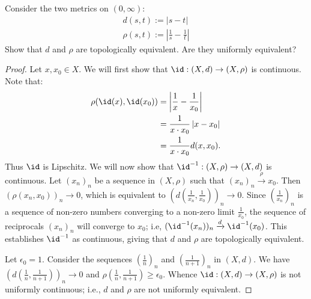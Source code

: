 \documentclass[11pt,twoside,openany]{memoir}
\begin{document}
    \addtocounter{exercise}{1}
    \iffalse
    \begin{exercise}
        Let $(X,d)$ be a metric space, $f,g:X \rightarrow F$ continuous maps, and $a \in F$. Show that $f+g$, $fg$, and $\alpha f$ are continuous.
    \end{exercise}
        {\color{red} \begin{proof}
            
        \end{proof}}
    \fi
    \begin{exercise}
        Consider the two metrics on $(0,\infty)$:
            \begin{equation*}
            \begin{split}
                d(s,t) := |s-t| \\
                \rho(s,t) := \left| \frac{1}{s} - \frac{1}{t} \right|
            \end{split}
            \end{equation*}
        Show that $d$ and $\rho$ are topologically equivalent. Are they uniformly equivalent?
    \end{exercise}
        {\color{red} \begin{proof}
            Let $x,x_0 \in X$. We will first show that $\id:(X,d) \rightarrow (X,\rho)$ is continuous. Note that:
                \begin{equation*}
                \begin{split}
                    \rho(\id(x),\id(x_0)) 
                    & = \left| \frac{1}{x} - \frac{1}{x_0} \right| \\
                    & = \frac{1}{x \cdot x_0} \left|x - x_0\right| \\
                    & = \frac{1}{x \cdot x_0} d(x,x_0).
                \end{split}
                \end{equation*}
            Thus $\id$ is Lipschitz. We will now show that $\id^{-1}:(X,\rho) \rightarrow (X,d)$ is continuous. Let $(x_n)_n$ be a sequence in $(X,\rho)$ such that $(x_n)_n \xrightarrow{\rho} x_0$. Then $(\rho(x_n,x_0))_n \rightarrow 0$, which is equivalent to $\left( d \left( \frac{1}{x_n}, \frac{1}{x_0} \right) \right)_n \rightarrow 0$. Since $\left( \frac{1}{x_n} \right)_n $ is a sequence of non-zero numbers converging to a non-zero limit $\frac{1}{x_0}$, the sequence of reciprocals $(x_n)_n$ will converge to $x_0$; i.e, $(\id^{-1}(x_n))_n \xrightarrow{d} \id^{-1}(x_0)$. This establishes $\id^{-1}$ as continuous, giving that $d$ and $\rho$ are topologically equivalent. 

            Let $\epsilon_0 =1$. Consider the sequences $\left( \frac{1}{n} \right)_n$ and $\left( \frac{1}{n+1} \right)_n$ in $(X,d)$. We have $\left( d \left( \frac{1}{n}, \frac{1}{n+1} \right) \right)_n \rightarrow 0$ and $\rho \left( \frac{1}{n}, \frac{1}{n+1} \right) \geq \epsilon_0$. Whence $\id:(X,d) \rightarrow (X,\rho)$ is not uniformly continuous; i.e., $d$ and $\rho$ are not uniformly equivalent.
        \end{proof}}
\end{document}
